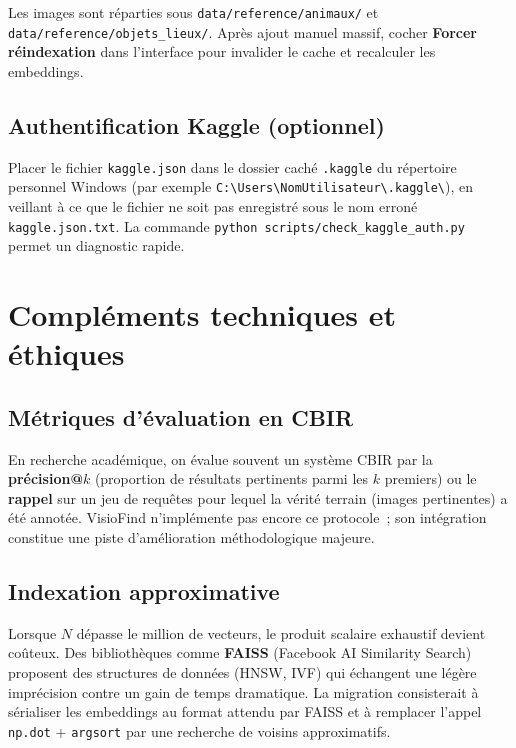 \documentclass[11pt,a4paper,openany]{report}
\begin{document}
Les images sont réparties sous \texttt{data/reference/animaux/} et \texttt{data/reference/objets\_lieux/}. Après ajout manuel massif, cocher \textbf{Forcer réindexation} dans l'interface pour invalider le cache et recalculer les embeddings.

\section{Authentification Kaggle (optionnel)}

Placer le fichier \texttt{kaggle.json} dans le dossier caché \texttt{.kaggle} du répertoire personnel Windows (par exemple \texttt{C:\textbackslash Users\textbackslash NomUtilisateur\textbackslash .kaggle\textbackslash}), en veillant à ce que le fichier ne soit pas enregistré sous le nom erroné \texttt{kaggle.json.txt}. La commande \texttt{python scripts/check\_kaggle\_auth.py} permet un diagnostic rapide.

\chapter{Compléments techniques et éthiques}

\section{Métriques d'évaluation en CBIR}

En recherche académique, on évalue souvent un système CBIR par la \textbf{précision@$k$} (proportion de résultats pertinents parmi les $k$ premiers) ou le \textbf{rappel} sur un jeu de requêtes pour lequel la vérité terrain (images pertinentes) a été annotée. VisioFind n'implémente pas encore ce protocole~; son intégration constitue une piste d'amélioration méthodologique majeure.

\section{Indexation approximative}

Lorsque $N$ dépasse le million de vecteurs, le produit scalaire exhaustif devient coûteux. Des bibliothèques comme \textbf{FAISS} (Facebook AI Similarity Search) proposent des structures de données (HNSW, IVF) qui échangent une légère imprécision contre un gain de temps dramatique. La migration consisterait à sérialiser les embeddings au format attendu par FAISS et à remplacer l'appel \texttt{np.dot} + \texttt{argsort} par une recherche de voisins approximatifs.
\end{document}
